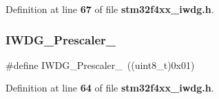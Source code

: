 Definition at line \textbf{ 67} of file \textbf{ stm32f4xx\+\_\+iwdg.\+h}.

\mbox{\label{group__IWDG__prescaler_ga59763b9a127c67adf5d11474188996a1}} 
\subsubsection{I\+W\+D\+G\+\_\+\+Prescaler\+\_}
{\footnotesize\ttfamily \#define I\+W\+D\+G\+\_\+\+Prescaler\+\_~((uint8\+\_\+t)0x01)}



Definition at line \textbf{ 64} of file \textbf{ stm32f4xx\+\_\+iwdg.\+h}.

